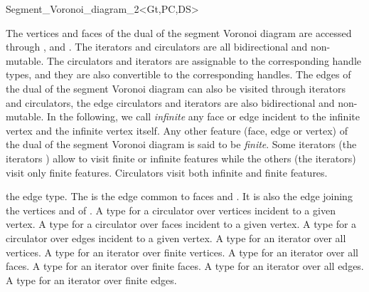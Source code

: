 \begin{ccRefClass}{Segment_Voronoi_diagram_2<Gt,PC,DS>}

The vertices and faces of the dual of the segment Voronoi diagram are
accessed through , 
 and . 
The iterators and circulators
are all bidirectional and non-mutable.
The circulators and iterators are assignable to the 
corresponding handle types, and they are also convertible to the
corresponding handles.
The edges of the dual of the segment Voronoi diagram can also be
visited through iterators and circulators,
the edge circulators and iterators
are also bidirectional and non-mutable.
In the following, we call {\it infinite} any face or edge 
incident  to the infinite vertex and the infinite vertex itself.
Any other feature (face, edge or vertex) of the dual of the segment
Voronoi diagram is said to be {\it finite}.
Some iterators (the  iterators ) allow to visit finite or 
infinite features while the others (the  iterators) visit only
finite features. Circulators visit both infinite and finite features.

%
 {the edge type.
The  is the edge common to faces  and 
. It is also the edge joining the vertices
 and  of .
}
%
{}
%
\ccGlue
{}
\ccGlue
{}
\ccGlue
{}
{A type for a circulator over vertices incident to a given vertex.}
\ccGlue
{}
{A type for a circulator over faces incident to a given vertex.}
\ccGlue
{}
{A type for a circulator over edges incident to a given vertex.}
\ccGlue
{}
{A type for an iterator over all vertices.}
\ccGlue
{}
{A type for an iterator over finite vertices.}
\ccGlue
{}
{A type for an iterator over all faces.}
\ccGlue
{}
{A type for an iterator over finite faces.}
\ccGlue
{}
{A type for an iterator over all edges.}
\ccGlue
{}
{A type for an iterator over finite edges.}



\end{ccRefClass}

